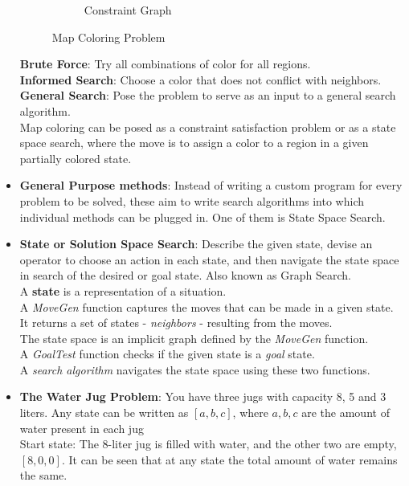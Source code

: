 \documentclass[a4paper]{article}
\begin{document}
\begin{itemize}
\begin{figure}[H]
\begin{subfigure}[b]{0.45\textwidth}
            \caption{Constraint Graph}
            \label{fig:AI-constraint-graph}
        \end{subfigure}
        \caption{Map Coloring Problem}
        \label{fig:AI-map-coloring-problem}
    \end{figure}
    \textbf{Brute Force}: Try all combinations of color for all regions.\\
    \textbf{Informed Search}: Choose a color that does not conflict with neighbors.\\
    \textbf{General Search}: Pose the problem to serve as an input to a general search algorithm.\\
    Map coloring can be posed as a constraint satisfaction problem or as a state space search, where the move is to assign a color to a region in a given partially colored state.
    \item \textbf{General Purpose methods}: Instead of writing a custom program for every problem to be solved, these aim to write search algorithms into which individual methods can be plugged in. One of them is State Space Search.
    \item \textbf{State or Solution Space Search}: Describe the given state, devise an operator to choose an action in each state, and then navigate the state space in search of the desired or goal state. Also known as Graph Search.\\
    A \textbf{state} is a representation of a situation.\\
    A \textit{MoveGen} function captures the moves that can be made in a given state.\\
    It returns a set of states - \textit{neighbors} - resulting from the moves.\\
    The state space is an implicit graph defined by the \textit{MoveGen} function.\\
    A \textit{GoalTest} function checks if the given state is a \textit{goal} state.\\
    A \textit{search algorithm} navigates the state space using these two functions.
    \item \textbf{The Water Jug Problem}: You have three jugs with capacity 8, 5 and 3 liters. Any state can be written as $[a,b,c]$, where $a,b,c$ are the amount of water present in each jug\\
    Start state: The 8-liter jug is filled with water, and the other two are empty, $[8,0,0]$. It can be seen that at any state the total amount of water remains the same.\\

\end{itemize}
\end{document}
